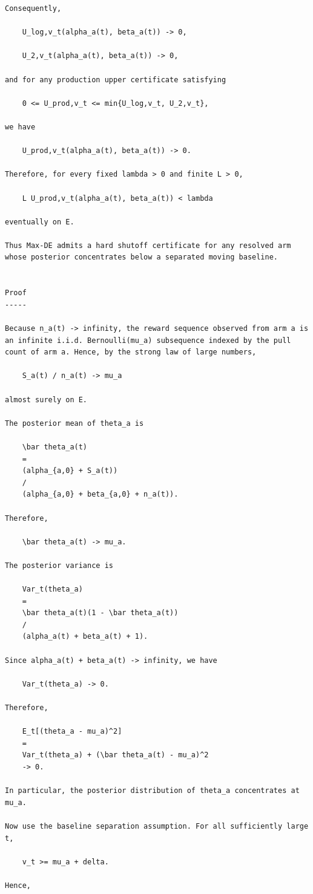 \begin{small}
\begin{verbatim}
Consequently,

    U_log,v_t(alpha_a(t), beta_a(t)) -> 0,

    U_2,v_t(alpha_a(t), beta_a(t)) -> 0,

and for any production upper certificate satisfying

    0 <= U_prod,v_t <= min{U_log,v_t, U_2,v_t},

we have

    U_prod,v_t(alpha_a(t), beta_a(t)) -> 0.

Therefore, for every fixed lambda > 0 and finite L > 0,

    L U_prod,v_t(alpha_a(t), beta_a(t)) < lambda

eventually on E.

Thus Max-DE admits a hard shutoff certificate for any resolved arm whose posterior concentrates below a separated moving baseline.


Proof
-----

Because n_a(t) -> infinity, the reward sequence observed from arm a is an infinite i.i.d. Bernoulli(mu_a) subsequence indexed by the pull count of arm a. Hence, by the strong law of large numbers,

    S_a(t) / n_a(t) -> mu_a

almost surely on E.

The posterior mean of theta_a is

    \bar theta_a(t)
    =
    (alpha_{a,0} + S_a(t))
    /
    (alpha_{a,0} + beta_{a,0} + n_a(t)).

Therefore,

    \bar theta_a(t) -> mu_a.

The posterior variance is

    Var_t(theta_a)
    =
    \bar theta_a(t)(1 - \bar theta_a(t))
    /
    (alpha_a(t) + beta_a(t) + 1).

Since alpha_a(t) + beta_a(t) -> infinity, we have

    Var_t(theta_a) -> 0.

Therefore,

    E_t[(theta_a - mu_a)^2]
    =
    Var_t(theta_a) + (\bar theta_a(t) - mu_a)^2
    -> 0.

In particular, the posterior distribution of theta_a concentrates at mu_a.

Now use the baseline separation assumption. For all sufficiently large t,

    v_t >= mu_a + delta.

Hence,


\end{verbatim}
\end{small}
